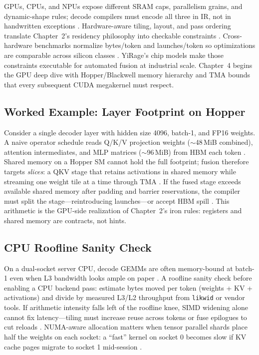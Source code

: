 GPUs, CPUs, and NPUs expose different SRAM caps, parallelism grains, and dynamic-shape rules; decode compilers must encode all three in IR, not in handwritten exceptions \citep{patel2025llminference,amd2024xdna}.
Hardware-aware tiling, layout, and pass ordering translate Chapter~2's residency philosophy into checkable constraints \citep{dlbook,nvidia2022hopper}.
Cross-hardware benchmarks normalize bytes/token and launches/token so optimizations are comparable across silicon classes \citep{memoryfloor2026,taxbreak2026}.
YiRage's chip models make those constraints executable for automated fusion at industrial scale.
Chapter~4 begins the GPU deep dive with Hopper/Blackwell memory hierarchy and TMA bounds that every subsequent CUDA megakernel must respect.


\subsection{Worked Example: Layer Footprint on Hopper}
\label{sec:ch03_worked_hopper}

Consider a single decoder layer with hidden size 4096, batch-1, and FP16 weights.
A naive operator schedule reads Q/K/V projection weights (${\sim}$48\,MiB combined), attention intermediates, and MLP matrices (${\sim}$96\,MiB) from HBM each token \citep{patel2025llminference,memoryfloor2026}.
Shared memory on a Hopper SM cannot hold the full footprint; fusion therefore targets \emph{slices}: a QKV stage that retains activations in shared memory while streaming one weight tile at a time through TMA \citep{nvidia2022hopper,semianalysis2024tma}.
If the fused stage exceeds available shared memory after padding and barrier reservations, the compiler must split the stage---reintroducing launches---or accept HBM spill \citep{memoryfloor2026}.
This arithmetic is the GPU-side realization of Chapter~2's iron rules: registers and shared memory are contracts, not hints.

\subsection{CPU Roofline Sanity Check}
\label{sec:ch03_cpu_roofline}

On a dual-socket server CPU, decode GEMMs are often memory-bound at batch-1 even when L3 bandwidth looks ample on paper \citep{memoryfloor2026,dlbook}.
A roofline sanity check before enabling a CPU backend pass: estimate bytes moved per token (weights + KV + activations) and divide by measured L3/L2 throughput from \texttt{likwid} or vendor tools.
If arithmetic intensity falls left of the roofline knee, SIMD widening alone cannot fix latency---tiling must increase reuse across tokens or fuse epilogues to cut reloads \citep{patel2025llminference}.
NUMA-aware allocation matters when tensor parallel shards place half the weights on each socket: a ``fast'' kernel on socket 0 becomes slow if KV cache pages migrate to socket 1 mid-session \citep{patel2025llminference}.

